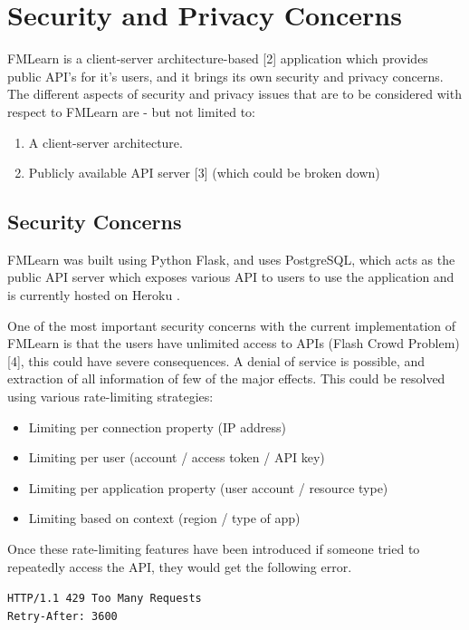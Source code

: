 \section{Security and Privacy Concerns}
FMLearn is a client-server architecture-based [2] application which provides public API’s for it's users, and it brings its own security and privacy concerns. The different aspects of security and privacy issues that are to be considered with respect to FMLearn are - but not limited to:

\begin{enumerate}
    \item A client-server architecture.
    \item Publicly available API server [3] (which could be broken down)
\end{enumerate}

\subsection{Security Concerns}

FMLearn was built using Python Flask, and uses PostgreSQL, which acts as the public API server which exposes various API to users to use the application and is currently hosted on Heroku .

One of the most important security concerns with the current implementation of FMLearn is that the users have unlimited access to APIs (Flash Crowd Problem) [4], this could have severe consequences. A denial of service is possible, and extraction of all information of few of the major effects. This could be resolved using various rate-limiting strategies:

\begin{itemize} 
    \item Limiting per connection property (IP address)
    \item Limiting per user (account / access token / API key)
    \item Limiting per application property (user account / resource type)
    \item Limiting based on context (region / type of app)
\end{itemize}

Once these rate-limiting features have been introduced if someone tried to repeatedly access the API, they would get the following error.

\quad\quad\quad\quad\quad\quad\quad\quad\quad\quad\quad\quad\quad
\texttt{HTTP/1.1 429 Too Many Requests}\\
\quad\quad\quad\quad\quad\quad\quad\quad\quad\quad\quad\quad\quad
\texttt{Retry-After: 3600}


